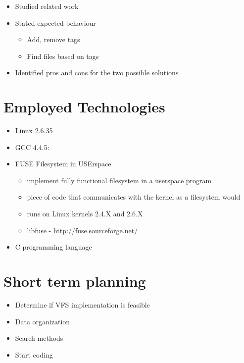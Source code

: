 \documentclass{beamer}
\begin{document}
\begin{frame}
  \begin{itemize}
  \item Studied related work
  \item Stated expected behaviour
    \begin{itemize}
        \item Add, remove tags
        \item Find files based on tags
    \end{itemize}
  \item Identified pros and cons for the two possible solutions
  \end{itemize}
\end{frame}

\section{Employed Technologies}

\begin{frame}
  \begin{itemize}
  \item Linux 2.6.35
  \item GCC 4.4.5:
  \item FUSE  Filesystem in USErspace
	\begin{itemize}
	\item implement fully functional filesystem in a userspace program 
	\item piece of code that communicates with the kernel as a filesystem would
	\item runs on Linux kernels 2.4.X and 2.6.X
    \item libfuse - http://fuse.sourceforge.net/
    \end{itemize}
  \item C programming language
  \end{itemize}
\end{frame}

\section{Short term planning}

\begin{frame}
  \begin{itemize}
    \item Determine if VFS implementation is feasible
    \item Data organization
    \item Search methods
    \item Start coding
  \end{itemize}
\end{frame}
\end{document}

